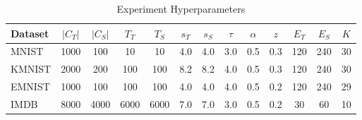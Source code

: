\begin{table}
\caption{Experiment Hyperparameters}
\label{tab:hyperparams-dkd}
\begin{tabular}{|l|c|c|c|c|c|c|c|c|c|c|c|c|}
\hline
Dataset & $|C_T|$ & $|C_S|$ & $T_T$ & $T_S$ & $s_T$ & $s_S$ & $\tau$ & $\alpha$ & $z$ & $E_T$ & $E_S$ & $K$ \\
\hline
MNIST & 1000 & 100 & 10 & 10 & 4.0 & 4.0 & 3.0 & 0.5 & 0.3 & 120 & 240 & 30 \\\hline
KMNIST & 2000 & 200 & 100 & 100 & 8.2 & 8.2 & 4.0 & 0.5 & 0.3 & 120 & 240 & 30 \\\hline
EMNIST & 1000 & 100 & 100 & 100 & 4.0 & 4.0 & 4.0 & 0.5 & 0.2 & 120 & 240 & 29 \\\hline
IMDB & 8000 & 4000 & 6000 & 6000 & 7.0 & 7.0 & 3.0 & 0.5 & 0.2 & 30 & 60 & 10 \\\hline
\end{tabular}
\end{table}